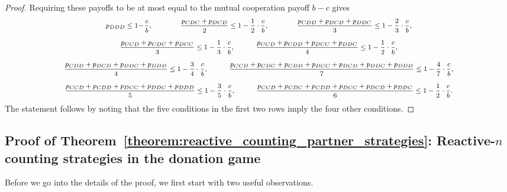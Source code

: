 \documentclass[11pt]{article}
\theoremstyle{plainCl1}
\theoremstyle{plainCl2}
\begin{document}
\begin{proof}
\noindent
Requiring these payoffs to be at most  equal to the mutual cooperation payoff $b\!-\!c$
gives
\begin{equation*} \footnotesize
\begin{array}{c}
\displaystyle  p_{DDD} \leq 1 \!- \!\frac{c}{b}, 
  \qquad \qquad \frac{p_{CDC} + p_{DCD}}{2} \leq 1 - \frac{1}{2} \cdot \frac{c}{b}, 
  \qquad \qquad \frac{p_{CDD} + p_{DCD} + p_{DDC}}{3} \leq 1 - \frac{2}{3} \cdot \frac{c}{b},\\[0.45cm]
\displaystyle  \frac{p_{CCD} + p_{CDC} + p_{DCC}}{3} \leq 1 - \frac{1}{3} \cdot \frac{c}{b},
  \quad \qquad \frac{p_{CCD} + p_{CDD} + p_{DCC} + p_{DDC}}{4} \leq 1 - \frac{1}{2}  \cdot \frac{c}{b}, \\[0.45cm]
\displaystyle  \frac{p_{CDD} + p_{DCD} + p_{DDC} + p_{DDD}}{4} \leq 1 - \frac{3}{4} \cdot \frac{c}{b}, 
  \quad \qquad \frac{p_{CCD} + p_{CDC} + p_{CDD} + p_{DCC} + p_{DCD} + p_{DDC} + p_{DDD}}{7} \leq 1 - \frac{4}{7} \cdot \frac{c}{b}, \\[0.45cm]
\displaystyle  \frac{p_{CCD} + p_{CDD} + p_{DCC} + p_{DDC} + p_{DDD}}{5} \leq 1 - \frac{3}{5} \cdot \frac{c}{b},
  \quad \qquad \frac{p_{CCD} + p_{CDC} + p_{CDD} + p_{DCC} + p_{DCD} + p_{DDC}}{6} \leq 1 - \frac{1}{2} \cdot \frac{c}{b}.
  \end{array}
\end{equation*}
The statement follows by noting that the five conditions in the first two rows imply the four other conditions.
\end{proof}





\subsection{Proof of Theorem~\ref{theorem:reactive_counting_partner_strategies}: Reactive-$n$ counting strategies in the donation game}

Before we go into the details of the proof, we first start with two useful observations.
\end{document}
